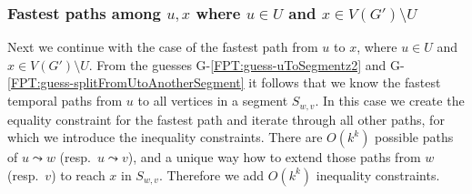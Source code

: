\documentclass[11pt,a4paper]{article}
\theoremstyle{remark}
\theoremstyle{definition}
\begin{document}
\subsubsection*{\boldmath Fastest paths among $u,x$ where $u \in U$ and $x \in V(G') \setminus U$}
Next we continue with the case of the fastest path from $u$ to $x$, where $u \in U$ and $x \in V(G') \setminus U$.
From the guesses G-\ref{FPT:guess-uToSegmentz2} and G-\ref{FPT:guess-splitFromUtoAnotherSegment} it follows that we know the fastest temporal paths from $u$ to all vertices in a segment $S_{w,v}$.
In this case we create the equality constraint for the fastest path and
iterate through all other paths, for which we introduce the inequality constraints.
There are $O(k^k)$ possible paths of $u \leadsto w$ (resp.~$u \leadsto v$),
and a unique way how to extend those paths from $w$ (resp.~$v$) to reach $x$ in $S_{w,v}$.
Therefore we add $O(k^k)$ inequality constraints.
\end{document}

